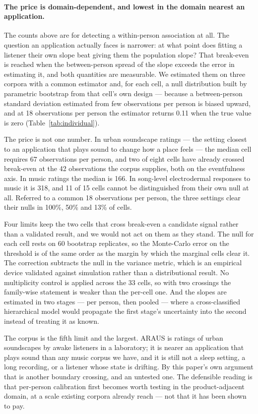 \paragraph{The price is domain-dependent, and lowest in the domain nearest an
application.} The counts above are for detecting a within-person association at
all. The question an application actually faces is narrower: at what point does
fitting a listener their own slope beat giving them the population slope? That
break-even is reached when the between-person spread of the slope exceeds the error
in estimating it, and both quantities are measurable. We estimated them on three
corpora with a common estimator and, for each cell, a null distribution built by
parametric bootstrap from that cell's own design --- because a between-person
standard deviation estimated from few observations per person is biased upward, and
at 18 observations per person the estimator returns 0.11 when the true value is
zero (Table~\ref{tab:individual}).

The price is not one number. In urban soundscape ratings --- the setting closest to
an application that plays sound to change how a place feels --- the median cell
requires 67 observations per person, and two of eight cells have already crossed
break-even at the 42 observations the corpus supplies, both on the eventfulness
axis. In music ratings the median is 166. In song-level electrodermal responses to
music it is 318, and 11 of 15 cells cannot be distinguished from their own null at
all. Referred to a common 18 observations per person, the three settings clear
their nulls in 100\%, 50\% and 13\% of cells.

Four limits keep the two cells that cross break-even a candidate signal rather
than a validated result, and we would not act on them as they stand. The null for
each cell rests on 60 bootstrap replicates, so the Monte-Carlo error on the
threshold is of the same order as the margin by which the marginal cells clear it.
The correction subtracts the null in the variance metric, which is an empirical
device validated against simulation rather than a distributional result. No
multiplicity control is applied across the 33 cells, so with two crossings the
family-wise statement is weaker than the per-cell one. And the slopes are
estimated in two stages --- per person, then pooled --- where a cross-classified
hierarchical model would propagate the first stage's uncertainty into the second
instead of treating it as known.

The corpus is the fifth limit and the largest. ARAUS \citep{ooi2024araus} is
ratings of urban
soundscapes by awake listeners in a laboratory; it is nearer an application that
plays sound than any music corpus we have, and it is still not a sleep setting, a
long recording, or a listener whose state is drifting. By this paper's own
argument that is another boundary crossing, and an untested one. The defensible
reading is that per-person calibration first becomes worth testing in the
product-adjacent domain, at a scale existing corpora already reach --- not that it
has been shown to pay.

